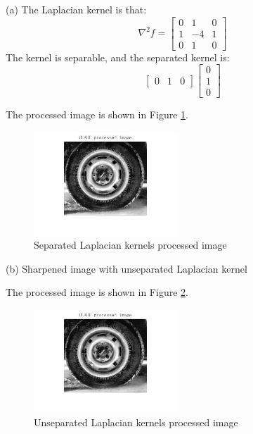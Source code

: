 \problem{}
(a) The Laplacian kernel is that:
$$
\nabla^2 f = \begin{bmatrix}
    0 & 1 & 0 \\
    1 & -4 & 1 \\
    0 & 1 & 0
\end{bmatrix}
$$
The kernel is separable, and the separated kernel is:
$$
\begin{bmatrix}
0 & 1 & 0
\end{bmatrix}
\begin{bmatrix}
0 \\
1 \\
0
\end{bmatrix}
$$

The processed image is shown in Figure \ref{fig:p2a}.

\begin{figure}[htbp]
    \centering
	\includegraphics[width=0.48\textwidth]{../images/p1/p1c_image.jpg}
    \caption{Separated Laplacian kernels processed image}
\label{fig:p2a}
\end{figure}


(b) Sharpened image with unseparated Laplacian kernel




The processed image is shown in Figure \ref{fig:p2b}.

\begin{figure}[htbp]
    \centering
	\includegraphics[width=0.48\textwidth]{../images/p1/p1c_image.jpg}
    \caption{Unseparated Laplacian kernels processed image}
\label{fig:p2b}
\end{figure}

